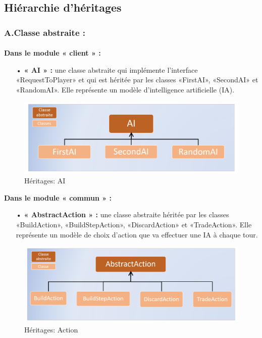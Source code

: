 \documentclass[13pt ,a4paper ]{report}
\begin{document}
\begin{multicols}{2}
	\subsection{Hiérarchie d’héritages }
		\subsubsection{A.\hspace*{0.5cm}Classe abstraite :}
		\paragraph{}
 		\textbf{Dans le module « client » :}
 	\begin{itemize}
 	\item[•]\textbf{« AI » : }une classe abstraite qui implémente l’interface «RequestToPlayer» et qui est héritée par les classes «FirstAI», «SecondAI» et «RandomAI». Elle représente un modèle d’intelligence artificielle (IA).
 	\end{itemize}
 
		\begin{figure}[H]
		\begin{center}
			\includegraphics[scale=0.23]{ai.png}
			\caption{Héritages: AI}
		\end{center}
		\end{figure}
	
	\textbf{Dans le module « commun » :}
 	\begin{itemize}
	 	\item[•]\textbf{« AbstractAction » :} une classe abstraite héritée par les classes «BuildAction», «BuildStepAction», «DiscardAction» et «TradeAction». Elle représente un modèle de choix d’action que va effectuer une IA à chaque tour.
	 \end{itemize}  
	     
	 	\begin{figure}[H]
      	\begin{center}
			\includegraphics[scale=0.23]{action.png}
			\caption{Héritages: Action}
		\end{center}
		\end{figure}
	

\end{multicols}
\end{document}
